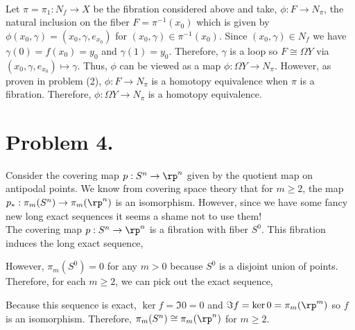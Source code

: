 \documentclass[12pt]{extarticle}
\begin{document}
\bigskip \\
Let $\pi = \pi_1 : N_f \to X$ be the fibration considered above and take, $\phi : F \to N_\pi$, the natural inclusion on the fiber $F = \pi^{-1}(x_0)$ which is given by $\phi(x_0, \gamma) = (x_0, \gamma, e_{x_0})$ for $(x_0, \gamma) \in \pi^{-1}(x_0)$. Since $(x_0, \gamma) \in N_f$ we have $\gamma(0) = f(x_0) = y_0$ and $\gamma(1) = y_0$. Therefore, $\gamma$ is a loop so $F \cong \Omega Y$ via $(x_0, \gamma, e_{x_0}) \mapsto \gamma$. Thus, $\phi$ can be viewed as a map $\phi : \Omega Y \to N_\pi$. However, as proven in problem (2), $\phi : F \to N_\pi$ is a homotopy equivalence when $\pi$ is a fibration. Therefore, $\phi : \Omega Y \to N_\pi$ is a homotopy equivalence. 
 
\section*{Problem 4.}
Consider the covering map $p : S^n \to \rp^n$ given by the quotient map on antipodal points. We know from covering space theory that for $m \ge 2$, the map $p_* : \pi_m(S^n) \to \pi_m(\rp^n)$ is an isomorphism. However, since we have some fancy new long exact sequences it seems a shame not to use them! \bigskip\\
The covering map $p : S^n \to \rp^n$ is a fibration with fiber $S^0$. This fibration induces the long exact sequence,
\begin{center}
\end{center}
However, $\pi_m(S^0) = 0$ for any $m > 0$ because $S^0$ is a disjoint union of points. Therefore, for each $m \ge 2$, we can pick out the exact sequence,
\begin{center}
\end{center}
Because this sequence is exact, $\ker{f} = \Im{0} = 0$ and $\Im{f} = \ker{0} = \pi_m(\rp^m)$ so $f$ is an isomorphism. Therefore, $\pi_m(S^n) \cong \pi_m(\rp^n)$ for $m \ge 2$.
\end{document}
